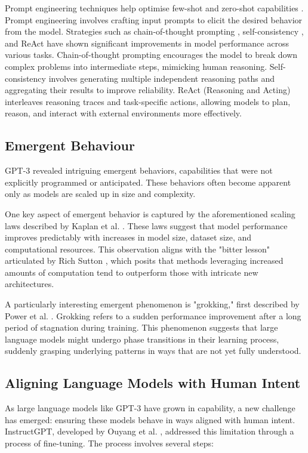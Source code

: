 \documentclass[a4paper, oneside]{discothesis}
\begin{document}
Prompt engineering techniques help optimise few-shot and zero-shot capabilities \cite{liu2021pre}. 
Prompt engineering involves crafting input prompts to elicit the desired behavior from the model. 
Strategies such as chain-of-thought prompting \cite{wei2022chain}, self-consistency \cite{wang2022self}, and ReAct \cite{yao2023react} have shown significant improvements in model performance across various tasks. Chain-of-thought prompting encourages the model to break down complex problems into intermediate steps, mimicking human reasoning. Self-consistency involves generating multiple independent reasoning paths and aggregating their results to improve reliability. ReAct (Reasoning and Acting) interleaves reasoning traces and task-specific actions, allowing models to plan, reason, and interact with external environments more effectively.

\subsection{Emergent Behaviour}
GPT-3 revealed intriguing emergent behaviors, capabilities that were not explicitly programmed or anticipated. These behaviors often become apparent only as models are scaled up in size and complexity.

One key aspect of emergent behavior is captured by the aforementioned scaling laws described by Kaplan et al. \cite{kaplan2020scaling}. These laws suggest that model performance improves predictably with increases in model size, dataset size, and computational resources. This observation aligns with the "bitter lesson" articulated by Rich Sutton \cite{sutton2019bitter}, which posits that methods leveraging increased amounts of computation tend to outperform those with intricate new architectures.

A particularly interesting emergent phenomenon is "grokking," first described by Power et al. \cite{power2022grokking}. Grokking refers to a sudden performance improvement after a long period of stagnation during training. This phenomenon suggests that large language models might undergo phase transitions in their learning process, suddenly grasping underlying patterns in ways that are not yet fully understood.

\subsection{Aligning Language Models with Human Intent}
As large language models like GPT-3 have grown in capability, a new challenge has emerged: ensuring these models behave in ways aligned with human intent. InstructGPT, developed by Ouyang et al. \cite{ouyang2022training}, addressed this limitation through a process of fine-tuning.
The process involves several steps:
\end{document}
